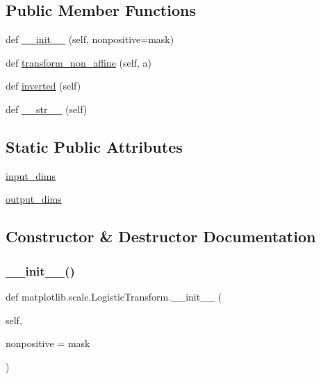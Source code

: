 \subsection*{Public Member Functions}
\begin{DoxyCompactItemize}
\item 
def \hyperlink{classmatplotlib_1_1scale_1_1LogisticTransform_a53977ea8b427b650492af3b42831400c}{\+\_\+\+\_\+init\+\_\+\+\_\+} (self, nonpositive=\textquotesingle{}mask\textquotesingle{})
\item 
def \hyperlink{classmatplotlib_1_1scale_1_1LogisticTransform_ae3e331389694e5d3fd97387333be46f5}{transform\+\_\+non\+\_\+affine} (self, a)
\item 
def \hyperlink{classmatplotlib_1_1scale_1_1LogisticTransform_a6908f2c93c35f5b24b563898652ef855}{inverted} (self)
\item 
def \hyperlink{classmatplotlib_1_1scale_1_1LogisticTransform_a45f23882b38b4023b0a81c7804634938}{\+\_\+\+\_\+str\+\_\+\+\_\+} (self)
\end{DoxyCompactItemize}
\subsection*{Static Public Attributes}
\begin{DoxyCompactItemize}
\item 
\hyperlink{classmatplotlib_1_1scale_1_1LogisticTransform_ad42f459ca4c63d1e1b24443c72096ef2}{input\+\_\+dims}
\item 
\hyperlink{classmatplotlib_1_1scale_1_1LogisticTransform_ae674f134aaf887898152fd181a640f20}{output\+\_\+dims}
\end{DoxyCompactItemize}


\subsection{Constructor \& Destructor Documentation}
\mbox{\label{classmatplotlib_1_1scale_1_1LogisticTransform_a53977ea8b427b650492af3b42831400c}} 
\subsubsection{\texorpdfstring{\+\_\+\+\_\+init\+\_\+\+\_\+()}{\_\_init\_\_()}}
{\footnotesize\ttfamily def matplotlib.\+scale.\+Logistic\+Transform.\+\_\+\+\_\+init\+\_\+\+\_\+ (\begin{DoxyParamCaption}\item[{}]{self,  }\item[{}]{nonpositive = {\ttfamily \textquotesingle{}mask\textquotesingle{}} }\end{DoxyParamCaption})}



